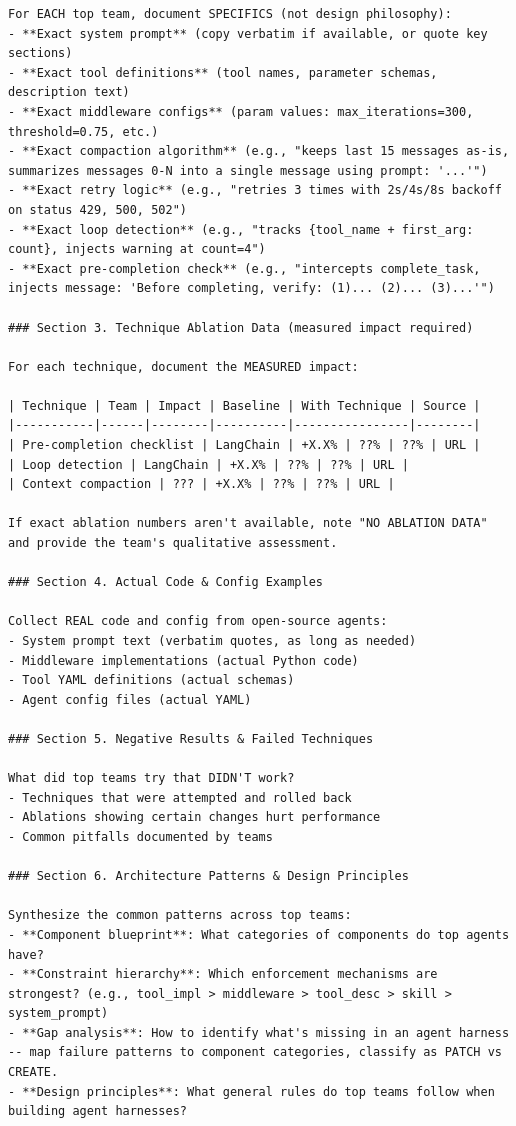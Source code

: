 \begin{tcolorbox}
\begin{lstlisting}
For EACH top team, document SPECIFICS (not design philosophy):
- **Exact system prompt** (copy verbatim if available, or quote key sections)
- **Exact tool definitions** (tool names, parameter schemas, description text)
- **Exact middleware configs** (param values: max_iterations=300, threshold=0.75, etc.)
- **Exact compaction algorithm** (e.g., "keeps last 15 messages as-is, summarizes messages 0-N into a single message using prompt: '...'")
- **Exact retry logic** (e.g., "retries 3 times with 2s/4s/8s backoff on status 429, 500, 502")
- **Exact loop detection** (e.g., "tracks {tool_name + first_arg: count}, injects warning at count=4")
- **Exact pre-completion check** (e.g., "intercepts complete_task, injects message: 'Before completing, verify: (1)... (2)... (3)...'")

### Section 3. Technique Ablation Data (measured impact required)

For each technique, document the MEASURED impact:

| Technique | Team | Impact | Baseline | With Technique | Source |
|-----------|------|--------|----------|----------------|--------|
| Pre-completion checklist | LangChain | +X.X% | ??% | ??% | URL |
| Loop detection | LangChain | +X.X% | ??% | ??% | URL |
| Context compaction | ??? | +X.X% | ??% | ??% | URL |

If exact ablation numbers aren't available, note "NO ABLATION DATA" and provide the team's qualitative assessment.

### Section 4. Actual Code & Config Examples

Collect REAL code and config from open-source agents:
- System prompt text (verbatim quotes, as long as needed)
- Middleware implementations (actual Python code)
- Tool YAML definitions (actual schemas)
- Agent config files (actual YAML)

### Section 5. Negative Results & Failed Techniques

What did top teams try that DIDN'T work?
- Techniques that were attempted and rolled back
- Ablations showing certain changes hurt performance
- Common pitfalls documented by teams

### Section 6. Architecture Patterns & Design Principles

Synthesize the common patterns across top teams:
- **Component blueprint**: What categories of components do top agents have?
- **Constraint hierarchy**: Which enforcement mechanisms are strongest? (e.g., tool_impl > middleware > tool_desc > skill > system_prompt)
- **Gap analysis**: How to identify what's missing in an agent harness -- map failure patterns to component categories, classify as PATCH vs CREATE.
- **Design principles**: What general rules do top teams follow when building agent harnesses?


\end{lstlisting}
\end{tcolorbox}
